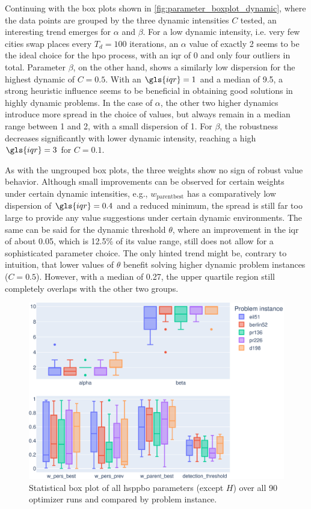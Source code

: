 Continuing with the box plots shown in \cref{fig:parameter_boxplot_dynamic}, where the data points are grouped by the three dynamic intensities $C$ tested, an interesting trend emerges for $\alpha$ and $\beta$. For a low dynamic intensity, i.e. very few cities swap places every $T_d = 100$ iterations, an $\alpha$ value of exactly 2 seems to be the ideal choice for the \gls{hpo} process, with an \gls{iqr} of 0 and only four outliers in total. Parameter $\beta$, on the other hand, shows a similarly low dispersion for the highest dynamic of $C = 0.5$. With an $\gls{iqr} = 1$ and a median of 9.5, a strong heuristic influence seems to be beneficial in obtaining good solutions in highly dynamic problems. In the case of $\alpha$, the other two higher dynamics introduce more spread in the choice of values, but always remain in a median range between 1 and 2, with a small dispersion of 1. For $\beta$, the robustness decreases significantly with lower dynamic intensity, reaching a high $\gls{iqr} = 3$ for $C = 0.1$.

As with the ungrouped box plots, the three weights show no sign of robust value behavior. Although small improvements can be observed for certain weights under certain dynamic intensities, e.g., $w_{\text{parentbest}}$ has a comparatively low dispersion of $\gls{iqr} = 0.4$ and a reduced minimum, the spread is still far too large to provide any value suggestions under certain dynamic environments. The same can be said for the dynamic threshold $\theta$, where an improvement in the \gls{iqr} of about 0.05, which is 12.5\% of its value range, still does not allow for a sophisticated parameter choice. The only hinted trend might be, contrary to intuition, that lower values of $\theta$ benefit solving higher dynamic problem instances ($C=0.5$). However, with a median of 0.27, the upper quartile region still completely overlaps with the other two groups.

\begin{figure}[h]
	\centering
	\includegraphics[width=\textwidth]{results/part2/parameter_boxplot_problem.svg}
	\caption[Statistical box plot of \gls{hsppbo} parameters compared by problem instance]{Statistical box plot of all \gls{hsppbo} parameters (except $H$) over all 90 optimizer runs and compared by problem instance.}
	\label{fig:parameter_boxplot_problem}
\end{figure}

